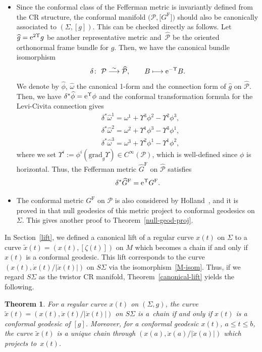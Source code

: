 \documentclass[11pt]{article}
\numberwithin{equation}{section}
\renewcommand\d{\delta}
\newcommand{\wh}{\widehat}
\numberwithin{equation}{section}
\newtheorem{Theorem}{Theorem}[section]
\begin{document}
\begin{Remark}
\begin{itemize}
\item[(ii)] Since the conformal class of the Fefferman metric is invariantly defined from the CR structure, the conformal manifold $\bigl(\mathcal{P}, \bigl[G^{\mathrm{F}}\bigr]\bigr)$ should also be canonically associated to $(\Sigma, [g])$. This can be checked directly as follows.
Let $\wh g={\rm e}^{2\Upsilon}g$ be another representative metric and~$\wh{\mathcal{P}}$ be the oriented orthonormal frame bundle for $\wh g$.
Then, we have the canonical bundle isomorphism
\[
\d\colon\ \mathcal{P}\overset{\sim}{\longrightarrow}
\wh{\mathcal{P}}, \qquad B\longmapsto {\rm e}^{-\Upsilon}B.
\]
We denote by
$\wh\phi$, $\wh\omega$ the canonical 1-form and the connection form of $\wh g$ on $\wh{\mathcal{P}}$. Then, we have $\d^*\wh\phi={\rm e}^{\Upsilon}\phi$ and
the conformal transformation formula for the Levi-Civita connection gives
\begin{align*}
&\d^*\wh\omega^1=\omega^1+\Upsilon^3\phi^2-\Upsilon^2\phi^3, \\
&\d^*\wh\omega^2=\omega^2+\Upsilon^1\phi^3-\Upsilon^3\phi^1, \\
&\d^*\wh\omega^3=\omega^3+\Upsilon^2\phi^1-\Upsilon^1\phi^2,
\end{align*}
where we set $\Upsilon^i:=\phi^i(\mathrm{grad}_g \Upsilon)\in C^\infty(\mathcal{P})$, which is well-defined since $\phi$ is horizontal.
Thus, the Fefferman metric $\wh{G}^{\mathrm{F}}$ on $\wh{\mathcal{P}}$ satisfies
\[
\d^* \wh{G}^{\mathrm{F}}={\rm e}^\Upsilon G^{\mathrm{F}}.
\]

\item[(iii)] The conformal metric $G^{\mathrm{F}}$ on $\mathcal{P}$ is also considered by Holland~\cite{H}, and it is proved in {\cite[Section~3.5.4]{H}} that null geodesics of this metric project to conformal geodesics on $\Sigma$. This gives another proof to Theorem~\ref{null-geod-proj}.
\end{itemize}
\end{Remark}

In Section~\ref{lift}, we defined a canonical lift of a regular curve $x(t)$ on $\Sigma$ to a curve $\tilde x(t)=(x(t), [\zeta(t)])$ on $M$ which becomes a chain if and only if $x(t)$ is a conformal geodesic. This lift corresponds to the curve $(x(t), \dot x(t)/|\dot x(t)|)$ on $S\Sigma$ via the isomorphism~\eqref{M-isom}. Thus, if we regard $S\Sigma$ as the twistor CR manifold,
Theorem~\ref{canonical-lift} yields the following.

\begin{Theorem}\label{chain-conf-geod2}
For a regular curve $x(t)$ on $(\Sigma, g)$, the curve $\tilde x(t)=(x(t), \dot x(t)/|\dot x(t)|)$ on $S\Sigma$ is a~chain if and only if $x(t)$ is a conformal geodesic of $[g]$. Moreover, for a conformal geodesic $x(t)$, $a\le t\le b$, the curve $\tilde x(t)$ is a unique chain through $(x(a), \dot x(a)/|\dot x(a)|)$ which projects to~$x(t)$.
\end{Theorem}
\end{document}
